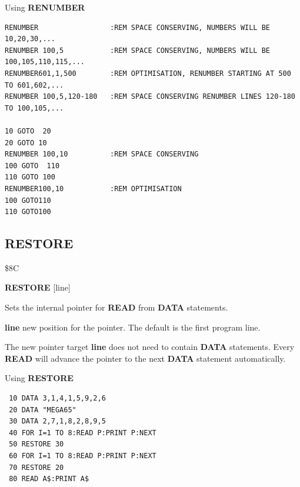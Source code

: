 \begin{description}[leftmargin=2cm,style=nextline]
\item [Examples:] Using {\bf RENUMBER}
\begin{tcolorbox}[colback=black,coltext=white]
\verbatimfont{\codefont}
\begin{verbatim}
RENUMBER                 :REM SPACE CONSERVING, NUMBERS WILL BE 10,20,30,...
RENUMBER 100,5           :REM SPACE CONSERVING, NUMBERS WILL BE 100,105,110,115,...
RENUMBER601,1,500        :REM OPTIMISATION, RENUMBER STARTING AT 500 TO 601,602,...
RENUMBER 100,5,120-180   :REM SPACE CONSERVING RENUMBER LINES 120-180 TO 100,105,...

10 GOTO  20
20 GOTO 10
RENUMBER 100,10          :REM SPACE CONSERVING
100 GOTO  110
110 GOTO 100
RENUMBER100,10           :REM OPTIMISATION
100 GOTO110
110 GOTO100
\end{verbatim}
\end{tcolorbox}
\end{description}


\newpage
\subsection{RESTORE}
\begin{description}[leftmargin=2cm,style=nextline]
\item [Token:] \$8C
\item [Format:] {\bf RESTORE} [line]
\item [Usage:]  Sets the internal pointer for
                {\bf READ} from {\bf DATA} statements.

                {\bf line} new position for the
                pointer. The default is the
                first program line.

\item [Remarks:] The new pointer target {\bf line}
                 does not need to contain {\bf DATA} statements.
                 Every {\bf READ} will advance
                 the pointer to the next {\bf DATA} statement automatically.
\item [Example:] Using {\bf RESTORE}

\begin{tcolorbox}[colback=black,coltext=white]
\verbatimfont{\codefont}
\begin{verbatim}
 10 DATA 3,1,4,1,5,9,2,6
 20 DATA "MEGA65"
 30 DATA 2,7,1,8,2,8,9,5
 40 FOR I=1 TO 8:READ P:PRINT P:NEXT
 50 RESTORE 30
 60 FOR I=1 TO 8:READ P:PRINT P:NEXT
 70 RESTORE 20
 80 READ A$:PRINT A$
\end{verbatim}
\end{tcolorbox}
\end{description}

